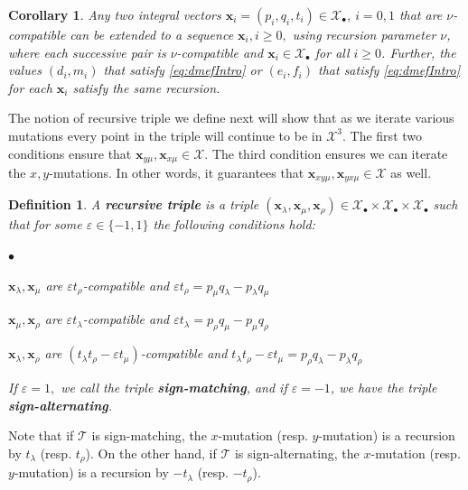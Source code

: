 \documentclass[11pt, reqno]{amsart}
\newtheorem{cor}[thm]{Corollary}
\newtheorem{definition}[thm]{Definition}
\theoremstyle{remark}
\numberwithin{equation}{subsection}
\numberwithin{figure}{section}
\theoremstyle{customremark}
\newcommand{\Tt}{\mathcal{T}}
\newenvironment{itemlist}
   { \begin{list} {$\bullet$}
         { \setlength{\topsep}{.5ex}  \setlength{\itemsep}{.5ex} \setlength{\leftmargin}{2.5ex} } }
   { \end{list} }
\newcommand{\la}{{\lambda}}
\newcommand{\eps}{\varepsilon}
\newcommand{\X}{\mathcal{X}}
\begin{document}
\begin{cor}\cite[Cor 3.1.3]{MM} \label{cor:recurExtend}
    Any two integral vectors $\bm{x}_i=(p_i,q_i,t_i) \in\X_\bullet$, $i=0,1$ that are $\nu$-compatible can be extended to a sequence $\bm{x}_i, i \geq 0,$ using recursion parameter $\nu$, where each successive pair is $\nu$-compatible and $\bm{x}_i \in\X_\bullet$ for all $i \geq 0$. Further, the values $(d_i,m_i)$ that satisfy \eqref{eq:dmefIntro} or $(e_i,f_i)$ that satisfy \eqref{eq:dmefIntro} for each $\bm{x}_i$ satisfy the same recursion. 
\end{cor}

The notion of recursive triple we define next will show that as we iterate various mutations every point in the triple will continue to be in $\X^3.$ The first two conditions ensure that $\bm{x}_{y\mu},\bm{x}_{x\mu} \in \X.$ The third condition ensures we can iterate the $x,y$-mutations. In other words, it guarantees that $\bm{x}_{xy\mu},\bm{x}_{yx\mu} \in \X$ as well. 


  \begin{definition} \label{def:genTrip}
        A {\bf recursive triple} is a triple $(\bm{x}_\la,\bm{x}_\mu,\bm{x}_\rho) \in \mathcal{X}_\bullet \times \mathcal{X}_\bullet \times \mathcal{X}_\bullet$ such that for some $\eps \in \{-1,1\}$ the following conditions hold: 
        \begin{itemlist}
            \item[{(i)}] $\bm{x}_\la,\bm{x}_\mu$ are $\eps t_\rho$-compatible and $\eps t_\rho=p_\mu q_\la-p_\la q_\mu$ 
            \item[{(ii)}] $\bm{x}_\mu,\bm{x}_\rho$ are $\eps t_\la$-compatible and $\eps t_\la=p_\rho q_\mu-p_\mu q_\rho$
            \item[{(iii)}] $\bm{x}_\la,\bm{x}_\rho$ are $(t_\la t_\rho-\eps t_\mu)$-compatible and $t_\la t_\rho-\eps t_\mu=p_\rho q_\la-p_\la q_\rho$
        \end{itemlist}
    If $\eps=1,$ we call the triple {\bf sign-matching}, and if $\eps=-1$, we have the triple {\bf sign-alternating}.
        
    
    \end{definition}

     Note that if $\Tt$ is sign-matching, the $x$-mutation (resp. $y$-mutation) is a recursion by $t_\la$ (resp. $t_\rho$). On the other hand, if $\Tt$ is sign-alternating, the $x$-mutation (resp. $y$-mutation) is a recursion by $-t_\la$ (resp. $-t_\rho$). 
\end{document}
